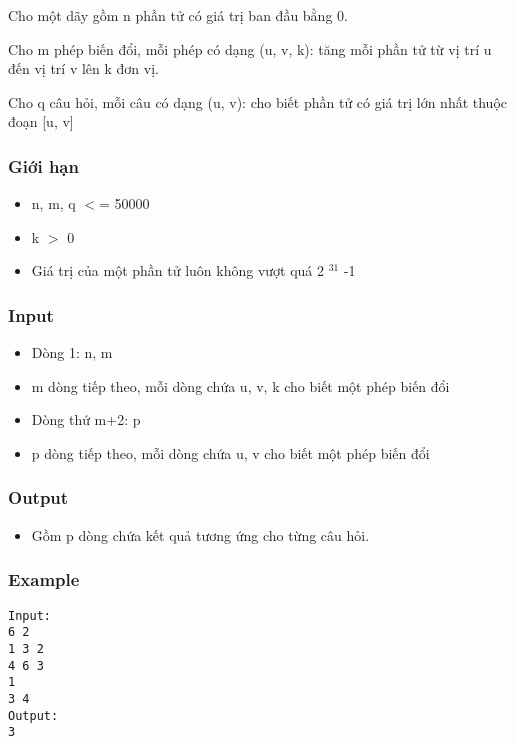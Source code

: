 



   Cho một dãy gồm n phần tử có giá trị ban đầu bằng 0.  

   Cho m phép biến đổi, mỗi phép có dạng (u, v, k): tăng mỗi phần tử từ vị trí u đến vị trí v lên k đơn vị.  

   Cho q câu hỏi, mỗi câu có dạng (u, v): cho biết phần tử có giá trị lớn nhất thuộc đoạn [u, v]  

\subsubsection{   Giới hạn  }
\begin{itemize}
	\item     n, m, q $<$= 50000   
	\item     k $>$ 0   
	\item     Giá trị của một phần tử luôn không vượt quá 2    $^     31    $    -1   
\end{itemize}

\subsubsection{   Input  }
\begin{itemize}
	\item     Dòng 1: n, m   
	\item     m dòng tiếp theo, mỗi dòng chứa u, v, k cho biết một phép biến đổi   
	\item     Dòng thứ m+2: p   
	\item     p dòng tiếp theo, mỗi dòng chứa u, v cho biết một phép biến đổi    
\\
\end{itemize}

\subsubsection{   Output  }
\begin{itemize}
	\item     Gồm p dòng chứa kết quả tương ứng cho từng câu hỏi.   
\end{itemize}

\subsubsection{   Example  }
\begin{verbatim}
Input:
6 2
1 3 2
4 6 3
1
3 4
Output:
3
\end{verbatim}